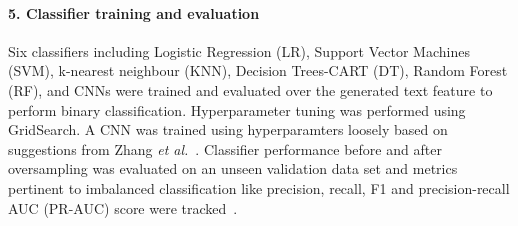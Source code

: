 \documentclass{IOS-Book-Article}
\begin{document}
\paragraph{5. Classifier training and evaluation}
\label{method:cpe}
%
Six classifiers including Logistic Regression (LR), Support Vector Machines (SVM), k-nearest neighbour (KNN), Decision Trees-CART (DT), Random Forest (RF), and CNNs were trained and evaluated over the generated text feature to perform binary classification.
Hyperparameter tuning was performed using GridSearch.
A CNN was trained using hyperparamters loosely based on suggestions from Zhang \textit{et al.}~\cite{Zhang2015-qd}.
Classifier performance before and after oversampling was evaluated on an unseen validation data set and metrics pertinent to imbalanced classification like precision, recall, F1 and precision-recall AUC (PR-AUC) score were tracked~\cite{pmid25738806}.
%
\end{document}
